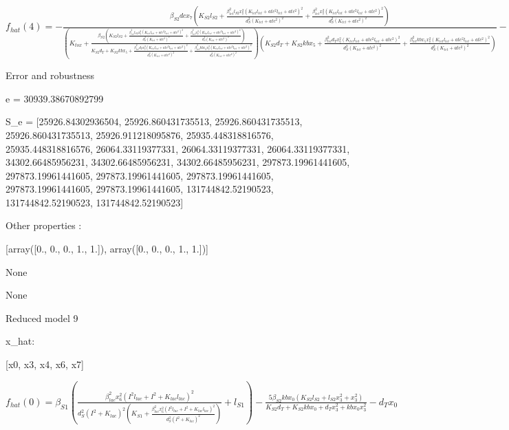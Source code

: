 $f_{hat}(4)=- \frac{\beta_{S2} dc x_{7} \left(K_{S2} l_{S2} + \frac{\beta_{tet}^{2} l_{S2} x_{7}^{2} \left(K_{tet} l_{tet} + atc^{2} l_{tet} + atc^{2}\right)^{2}}{d_{S}^{2} \left(K_{tet} + atc^{2}\right)^{2}} + \frac{\beta_{tet}^{2} x_{7}^{2} \left(K_{tet} l_{tet} + atc^{2} l_{tet} + atc^{2}\right)^{2}}{d_{S}^{2} \left(K_{tet} + atc^{2}\right)^{2}}\right)}{\left(K_{tox} + \frac{\beta_{S2} \left(K_{S2} l_{S2} + \frac{\beta_{tet}^{2} l_{S2} x_{7}^{2} \left(K_{tet} l_{tet} + atc^{2} l_{tet} + atc^{2}\right)^{2}}{d_{S}^{2} \left(K_{tet} + atc^{2}\right)^{2}} + \frac{\beta_{tet}^{2} x_{7}^{2} \left(K_{tet} l_{tet} + atc^{2} l_{tet} + atc^{2}\right)^{2}}{d_{S}^{2} \left(K_{tet} + atc^{2}\right)^{2}}\right)}{K_{S2} d_{T} + K_{S2} kb x_{5} + \frac{\beta_{tet}^{2} d_{T} x_{7}^{2} \left(K_{tet} l_{tet} + atc^{2} l_{tet} + atc^{2}\right)^{2}}{d_{S}^{2} \left(K_{tet} + atc^{2}\right)^{2}} + \frac{\beta_{tet}^{2} kb x_{5} x_{7}^{2} \left(K_{tet} l_{tet} + atc^{2} l_{tet} + atc^{2}\right)^{2}}{d_{S}^{2} \left(K_{tet} + atc^{2}\right)^{2}}}\right) \left(K_{S2} d_{T} + K_{S2} kb x_{5} + \frac{\beta_{tet}^{2} d_{T} x_{7}^{2} \left(K_{tet} l_{tet} + atc^{2} l_{tet} + atc^{2}\right)^{2}}{d_{S}^{2} \left(K_{tet} + atc^{2}\right)^{2}} + \frac{\beta_{tet}^{2} kb x_{5} x_{7}^{2} \left(K_{tet} l_{tet} + atc^{2} l_{tet} + atc^{2}\right)^{2}}{d_{S}^{2} \left(K_{tet} + atc^{2}\right)^{2}}\right)} - d x_{7} + kc x_{7} \left(1 - \frac{x_{6} + x_{7}}{C_{max}}\right)$



Error and robustness 


e = 30939.38670892799

S_e = [25926.84302936504, 25926.860431735513, 25926.860431735513, 25926.860431735513, 25926.911218095876, 25935.448318816576, 25935.448318816576, 26064.33119377331, 26064.33119377331, 26064.33119377331, 34302.66485956231, 34302.66485956231, 34302.66485956231, 297873.19961441605, 297873.19961441605, 297873.19961441605, 297873.19961441605, 297873.19961441605, 297873.19961441605, 131744842.52190523, 131744842.52190523, 131744842.52190523]

Other properties :


[array([0., 0., 0., 1., 1.]), array([0., 0., 0., 1., 1.])]

None

None

Reduced model 9

x_{hat}: 

[x0, x3, x4, x6, x7]


$f_{hat}(0)=\beta_{S1} \left(\frac{\beta_{lac}^{2} x_{6}^{2} \left(I^{2} l_{lac} + I^{2} + K_{lac} l_{lac}\right)^{2}}{d_{S}^{2} \left(I^{2} + K_{lac}\right)^{2} \left(K_{S1} + \frac{\beta_{lac}^{2} x_{6}^{2} \left(I^{2} l_{lac} + I^{2} + K_{lac} l_{lac}\right)^{2}}{d_{S}^{2} \left(I^{2} + K_{lac}\right)^{2}}\right)} + l_{S1}\right) - \frac{5 \beta_{S2} kb x_{0} \left(K_{S2} l_{S2} + l_{S2} x_{3}^{2} + x_{3}^{2}\right)}{K_{S2} d_{T} + K_{S2} kb x_{0} + d_{T} x_{3}^{2} + kb x_{0} x_{3}^{2}} - d_{T} x_{0}$


